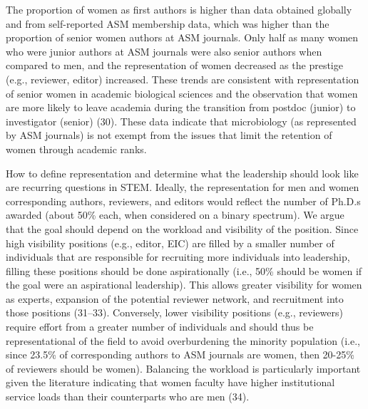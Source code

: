 \documentclass[11pt,]{article}
\begin{document}
The proportion of women as first authors is higher than data obtained
globally and from self-reported ASM membership data, which was higher
than the proportion of senior women authors at ASM journals. Only half
as many women who were junior authors at ASM journals were also senior
authors when compared to men, and the representation of women decreased
as the prestige (e.g., reviewer, editor) increased. These trends are
consistent with representation of senior women in academic biological
sciences and the observation that women are more likely to leave
academia during the transition from postdoc (junior) to investigator
(senior) (30). These data indicate that microbiology (as represented by
ASM journals) is not exempt from the issues that limit the retention of
women through academic ranks.

How to define representation and determine what the leadership should
look like are recurring questions in STEM. Ideally, the representation
for men and women corresponding authors, reviewers, and editors would
reflect the number of Ph.D.s awarded (about 50\% each, when considered
on a binary spectrum). We argue that the goal should depend on the
workload and visibility of the position. Since high visibility positions
(e.g., editor, EIC) are filled by a smaller number of individuals that
are responsible for recruiting more individuals into leadership, filling
these positions should be done aspirationally (i.e., 50\% should be
women if the goal were an aspirational leadership). This allows greater
visibility for women as experts, expansion of the potential reviewer
network, and recruitment into those positions (31--33). Conversely,
lower visibility positions (e.g., reviewers) require effort from a
greater number of individuals and should thus be representational of the
field to avoid overburdening the minority population (i.e., since 23.5\%
of corresponding authors to ASM journals are women, then 20-25\% of
reviewers should be women). Balancing the workload is particularly
important given the literature indicating that women faculty have higher
institutional service loads than their counterparts who are men (34).
\end{document}
